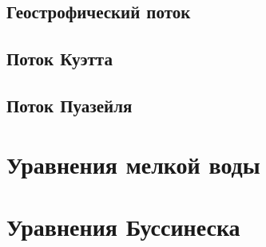 \subsection{Геострофический поток}
    \lipsum[1-2]

\subsection{Поток Куэтта}
    \lipsum[1-2]

\subsection{Поток Пуазейля}
    \lipsum[1-2]

\section{Уравнения мелкой воды}
    \lipsum[1-2]

\section{Уравнения Буссинеска}
    \lipsum[1-2]

